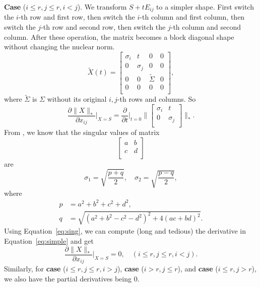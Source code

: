 \textbf{Case} ($i\le r,j\le r,i<j$).
We transform $S+tE_{ij}$ to a simpler shape.
First switch the $i$-th row and first row,
then switch the $i$-th column and first column,
then switch the $j$-th row and second row,
then switch the $j$-th column and second column.
After these operation,
the matrix becomes a block diagonal shape without changing the nuclear norm.
\begin{equation}
    \tilde X(t)=\begin{bmatrix}
    \sigma_i & t        & 0            & 0 \\
    0        & \sigma_j & 0            & 0 \\
    0        & 0        & \tilde\Sigma & 0 \\
    0        & 0        & 0            & 0 \\
\end{bmatrix},
\end{equation}
where $\tilde\Sigma$ is $\Sigma$ without its original $i,j$-th rows and columns.
So
\begin{equation}\label{eq:simple}
    \frac{\partial\|X\|_*}{\partial x_{ij}}\bigg|_{X=S}
        =\frac{\partial}{\partial t}\bigg|_{t=0}
            \bigg\|\begin{bmatrix}
                \sigma_i & t        \\
                0        & \sigma_j \\
            \end{bmatrix}\bigg\|_*.
\end{equation}
From \cite{svd},
we know that the singular values of matrix
\begin{equation}
    \begin{bmatrix}
        a & b \\
        c & d \\
    \end{bmatrix}
\end{equation}
are
\begin{equation}\label{eq:sing}
    \sigma_1=\sqrt{\frac{p+q}{2}},\quad
    \sigma_2=\sqrt{\frac{p-q}{2}},
\end{equation}
where
\begin{equation}
\begin{split}
    p &= a^2+b^2+c^2+d^2, \\
    q &= \sqrt{(a^2+b^2-c^2-d^2)^2+4(ac+bd)^2}.
\end{split}
\end{equation}
Using Equation~\eqref{eq:sing},
we can compute (long and tedious) the derivative in Equation~\eqref{eq:simple}
and get
\begin{equation}
    \frac{\partial\|X\|_*}{\partial x_{ij}}\bigg|_{X=S}
        = 0,\quad (i\le r,j\le r,i<j).
\end{equation}
Similarly,
for
\textbf{case} ($i\le r,j\le r,i>j$),
\textbf{case} ($i>r, j\le r$),
and \textbf{case} ($i\le r, j>r$),
we also have the partial derivatives being $0$.

